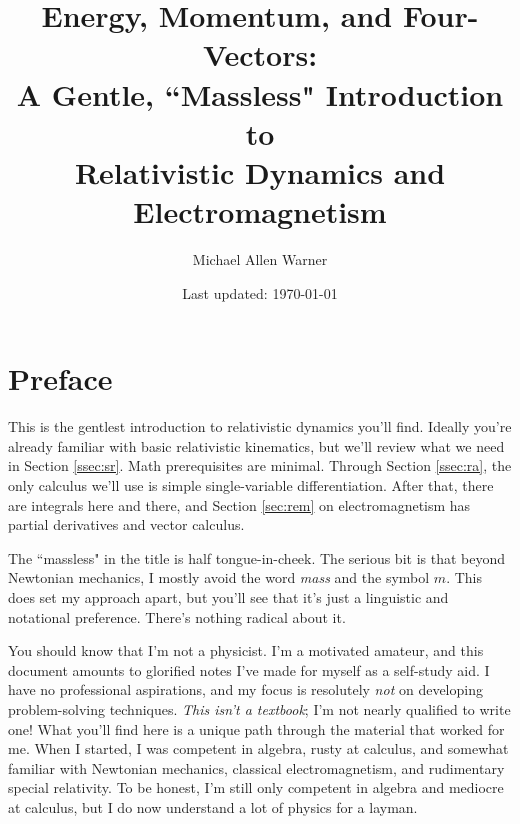 \documentclass[12pt]{article}
\begin{document}
\title{Energy, Momentum, and Four-Vectors:\\A Gentle, ``Massless" Introduction to\\Relativistic Dynamics and Electromagnetism}
\author{Michael Allen Warner}
\date{Last updated: \today}
\maketitle

\section*{Preface}\label{sec:p}

This is the gentlest introduction to relativistic dynamics you'll find. Ideally you're already familiar with basic relativistic kinematics, but we'll review what we need in Section \ref{ssec:sr}. Math prerequisites are minimal. Through Section \ref{ssec:ra}, the only calculus we'll use is simple single-variable differentiation. After that, there are integrals here and there, and Section \ref{sec:rem} on electromagnetism has partial derivatives and vector calculus.

The ``massless" in the title is half tongue-in-cheek. The serious bit is that beyond Newtonian mechanics, I mostly avoid the word \emph{mass} and the symbol $m$. This does set my approach apart, but you'll see that it's just a linguistic and notational preference. There's nothing radical about it.

You should know that I'm not a physicist. I'm a motivated amateur, and this document amounts to glorified notes I've made for myself as a self-study aid. I have no professional aspirations, and my focus is resolutely \emph{not} on developing problem-solving techniques. \emph{This isn't a textbook}; I'm not nearly qualified to write one! What you'll find here is a unique path through the material that worked for me. When I started, I was competent in algebra, rusty at calculus, and somewhat familiar with Newtonian mechanics, classical electromagnetism, and rudimentary special relativity. To be honest, I'm still only competent in algebra and mediocre at calculus, but I do now understand a lot of physics for a layman.
\end{document}
